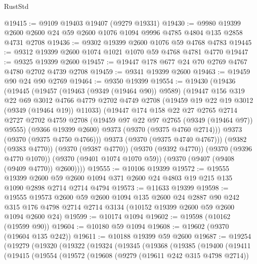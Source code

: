 \begin{lexlean}{RustStd}
\begin{coremodule}
{\begin{coremodule}
{{{{{{{{{{{{{{{{{{{{{{{{{{{{{{{{{{{{{{{@19415 := @9109 @19403 @19407 (@9279 @19331)
@19430 := @9980
    @19399
    @2600
    @2600
    @24
    @59
    @2600
    @1076
    @1094
    @9996
    @4785
    @4804
    @135
    @2858
    @4731
    @2708
@19436 := @9302 @19399 @2600 @1076 @59 @4768 @4783
@19445 := @9312 @19399 @2600 @1074 @1021 @1070 @59 @4768 @4781 @4770
@19447 := @9325 @19399 @2600
@19457 := @19447 @178 @677 @24 @70 @2769 @4767 @4780 @2702 @4739 @2708
@19459 := @9341 @19399 @2600
@19463 := @19459 @90 @24 @90 @2769
@19464 := @9350 @19399
@19554 := @19430
    (@19436
      (@19445
        (@19457
          (@19463 (@9349 (@19464 @90)) @9589)
          (@19447
            @156
            @319
            @22
            @69
            @3012
            @4766
            @4779
            @2702
            @4749
            @2708
            (@19459 @19 @22 @19 @3012 (@9349 (@19464 @19)) @11033)
            (@19447
              @174
              @158
              @22
              @27
              @2765
              @2714
              @2727
              @2702
              @4759
              @2708
              (@19459 @97 @22 @97 @2765 (@9349 (@19464 @97)) @9555)
              (@9366 @19399 @2600)
              @9373
              (@9370 (@9375 @4760 @2714)))
            @9373
            (@9370 (@9375 @4750 @4766)))
          @9373
          (@9370 (@9375 @4740 @4767)))
        (@9382 (@9383 @4770))
        (@9370 (@9387 @4770))
        (@9370 (@9392 @4770))
        (@9370 (@9396 @4770 @1070))
        (@9370 (@9401 @1074 @1070 @59))
        (@9370 (@9407 (@9408 (@9409 @4770)) @2600))))
@19555 := @10106 @19399
@19572 := @19555
    @19399
    @2600
    @59
    @2600
    @1094
    @371
    @2600
    @24
    @4803
    @19
    @215
    @135
    @1090
    @2898
    @2714
    @2714
    @4794
@19573 := @11633 @19399
@19598 := @19555
    @19573
    @2600
    @59
    @2600
    @1094
    @135
    @2600
    @24
    @2887
    @90
    @242
    @315
    @176
    @4798
    @2714
    @2714
    @3134
    (@10152 @19399 @2600 @59 @2600 @1094 @2600 @24)
@19599 := @10174 @1094
@19602 := @19598 (@10162 (@19599 @90))
@19604 := @10180 @59 @1094
@19608 := @19602 (@9370 (@19604 @135 @242))
@19611 := @10188 @19399 @59 @2600
@19687 := @19254
    (@19279
      (@19320
        (@19322
          (@19324
            (@19345
              (@19368
                (@19385
                  (@19400
                    (@19411
                      (@19415
                        (@19554
                          (@19572
                            (@19608
                              (@9279 (@19611 @242 @315 @4798 @2714))
}}}}}}}}}}}}}}}}}}}}}}}}}}}}}}}}}}}}}}}
\end{coremodule}}
\end{coremodule}
\end{lexlean}
